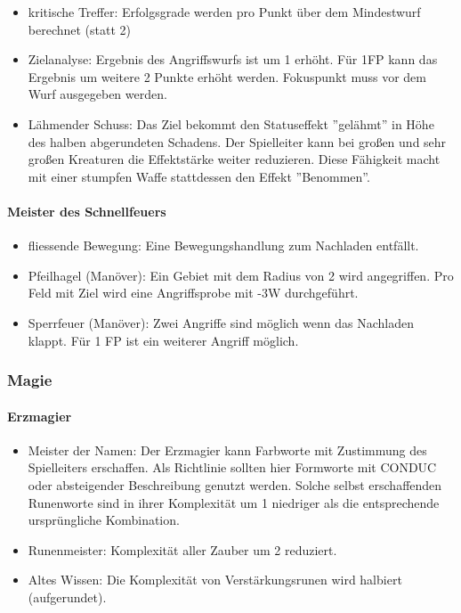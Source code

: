 \documentclass{article}
\begin{document}
\begin{itemize}
\item kritische Treffer: Erfolgsgrade werden pro Punkt über dem Mindestwurf berechnet (statt 2)
\item Zielanalyse: Ergebnis des Angriffswurfs ist um 1 erhöht. Für 1FP kann das Ergebnis um weitere 2 Punkte erhöht werden. Fokuspunkt muss vor dem Wurf ausgegeben werden.
\item Lähmender Schuss: Das Ziel bekommt den Statuseffekt ''gelähmt'' in Höhe des halben abgerundeten Schadens. Der Spielleiter kann bei großen und sehr großen Kreaturen die Effektstärke weiter reduzieren. Diese Fähigkeit macht mit einer stumpfen Waffe stattdessen den Effekt ''Benommen''.
\end{itemize}

\paragraph{Meister des Schnellfeuers}

\begin{itemize}
\item fliessende Bewegung: Eine Bewegungshandlung zum Nachladen entfällt.
\item Pfeilhagel (Manöver): Ein Gebiet mit dem Radius von 2 wird angegriffen. Pro Feld mit Ziel wird eine Angriffsprobe mit -3W durchgeführt.
\item Sperrfeuer (Manöver): Zwei Angriffe sind möglich wenn das Nachladen klappt. Für 1 FP ist ein weiterer Angriff möglich.
\end{itemize}

\subsubsection{Magie}

\paragraph{Erzmagier }

\begin{itemize}
\item Meister der Namen: Der Erzmagier kann Farbworte mit Zustimmung des Spielleiters erschaffen. Als Richtlinie sollten hier Formworte mit CONDUC oder absteigender Beschreibung genutzt werden. Solche selbst erschaffenden Runenworte sind in ihrer Komplexität um 1 niedriger als die entsprechende ursprüngliche Kombination.
\item Runenmeister: Komplexität aller Zauber um 2 reduziert.
\item Altes Wissen: Die Komplexität von Verstärkungsrunen wird halbiert (aufgerundet).
\end{itemize}
\end{document}
